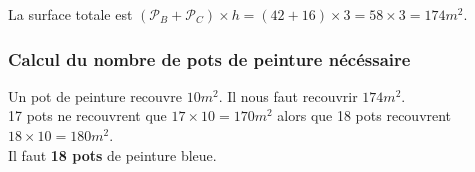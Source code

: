 \documentclass[11pt]{article}
\begin{document}
La surface totale est $(\mathcal{P}_{B} + \mathcal{P}_{C}) \times h = (42 + 16) \times 3 = 58 \times 3 = 174m^2$.\\

\subsubsection{Calcul du nombre de pots de peinture nécéssaire}
Un pot de peinture recouvre $10m^2$. Il nous faut recouvrir $174m^2$.\\
17 pots ne recouvrent que $17 \times 10 = 170m^2$ alors que 18 pots recouvrent $18 \times 10 = 180m^2$.\\
Il faut \textbf{18 pots} de peinture bleue.

\end{document}

